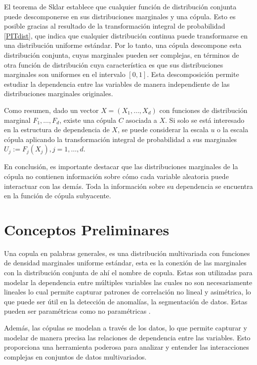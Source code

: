 El teorema de Sklar establece que cualquier función de distribución conjunta puede descomponerse en sus distribuciones marginales y una cópula. Esto es posible gracias al resultado de la transformación integral de probabilidad \eqref{PITdist}, que indica que cualquier distribución continua puede transformarse en una distribución uniforme estándar. Por lo tanto, una cópula descompone esta distribución conjunta, cuyas marginales pueden ser complejas, en términos de otra función de distribución cuya característica es que sus distribuciones marginales son uniformes en el intervalo $[0,1]$. Esta descomposición permite estudiar la dependencia entre las variables de manera independiente de las distribuciones marginales originales.

Como resumen, dado un vector $X = (X_1, \dots, X_d)$ con funciones de distribución marginal $F_1, \dots, F_d$, existe una cópula $C$ asociada a $X$. Si solo se está interesado en la estructura de dependencia de $X$, se puede considerar la escala $u$ o la escala cópula aplicando la transformación integral de probabilidad a sus marginales $U_j := F_j(X_j), j = 1, \dots, d$.

En conclusión, es importante destacar que las distribuciones marginales de la cópula no contienen información sobre cómo cada variable aleatoria puede interactuar con las demás. Toda la información sobre su dependencia se encuentra en la función de cópula subyacente.

\section{Conceptos Preliminares}

Una copula en palabras generales, es una distribución multivariada con funciones de densidad marginales uniforme estándar, esta es la conexión de las marginales con la distribución conjunta de ahí el nombre de copula. Estas son utilizadas para modelar la dependencia entre múltiples variables las cuales no son necesariamente lineales lo cual permite capturar patrones de correlación no lineal y asimétrica, lo que puede ser útil en la detección de anomalías, la segmentación de datos. Estas pueden ser paramétricas como no paramétricas \cite{CopulasR}.

Además, las cópulas se modelan a través de los datos, lo que permite capturar y modelar de manera precisa las relaciones de dependencia entre las variables. Esto proporciona una herramienta poderosa para analizar y entender las interacciones complejas en conjuntos de datos multivariados.


